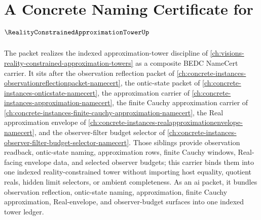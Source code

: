 \chapter{A Concrete Naming Certificate for $\RealityConstrainedApproximationTowerUp$}
\label{ch:concrete-instances-reality-constrained-approximation-tower-namecert}

The \RealityConstrainedApproximationTowerUp packet realizes the indexed approximation-tower discipline of \autoref{ch:visions-reality-constrained-approximation-towers} as a composite BEDC NameCert carrier. It sits after the observation reflection packet of \autoref{ch:concrete-instances-observationreflectionpacket-namecert}, the ontic-state packet of \autoref{ch:concrete-instances-onticstate-namecert}, the approximation carrier of \autoref{ch:concrete-instances-approximation-namecert}, the finite Cauchy approximation carrier of \autoref{ch:concrete-instances-finite-cauchy-approximation-namecert}, the Real approximation envelope of \autoref{ch:concrete-instances-realapproximationenvelope-namecert}, and the observer-filter budget selector of \autoref{ch:concrete-instances-observer-filter-budget-selector-namecert}. Those siblings provide observation readback, ontic-state naming, approximation rows, finite Cauchy windows, Real-facing envelope data, and selected observer budgets; this carrier binds them into one indexed reality-constrained tower without importing host equality, quotient reals, hidden limit selectors, or ambient completeness.
As an ai packet, it bundles observation reflection, ontic-state
naming, approximation, finite Cauchy approximation, Real-envelope, and
observer-budget surfaces into one indexed tower ledger.

